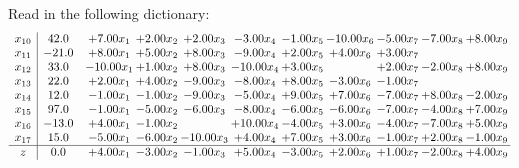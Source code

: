 \documentclass[9pt]{article}
\begin{document}
Read in the following dictionary:
\[\begin{array}{c| c c@{\hskip 2pt} c@{\hskip 2pt} c@{\hskip 2pt} c@{\hskip 2pt} c@{\hskip 2pt} c@{\hskip 2pt} c@{\hskip 2pt} c@{\hskip 2pt} c@{\hskip 2pt} }
 x_{10}   &  42.0 & +  7.00 x_{1} & +  2.00 x_{2} & +  2.00 x_{3} & -3.00 x_{4} & -1.00 x_{5} & -10.00 x_{6} & -5.00 x_{7} & -7.00 x_{8} & +  8.00 x_{9}\\
 x_{11}   &  -21.0 & +  8.00 x_{1} & +  5.00 x_{2} & +  8.00 x_{3} & -9.00 x_{4} & +  2.00 x_{5} & +  4.00 x_{6} & +  3.00 x_{7} &    &   \\
 x_{12}   &  33.0 & -10.00 x_{1} & +  1.00 x_{2} & +  8.00 x_{3} & -10.00 x_{4} & +  3.00 x_{5} &   & +  2.00 x_{7} & -2.00 x_{8} & +  8.00 x_{9}\\
 x_{13}   &  22.0 & +  2.00 x_{1} & +  4.00 x_{2} & -9.00 x_{3} & -8.00 x_{4} & +  8.00 x_{5} & -3.00 x_{6} & -1.00 x_{7} &    &   \\
 x_{14}   &  12.0 & -1.00 x_{1} & -1.00 x_{2} & -9.00 x_{3} & -5.00 x_{4} & +  9.00 x_{5} & +  7.00 x_{6} & -7.00 x_{7} & +  8.00 x_{8} & -2.00 x_{9}\\
 x_{15}   &  97.0 & -1.00 x_{1} & -5.00 x_{2} & -6.00 x_{3} & -8.00 x_{4} & -6.00 x_{5} & -6.00 x_{6} & -7.00 x_{7} & -4.00 x_{8} & +  7.00 x_{9}\\
 x_{16}   &  -13.0 & +  4.00 x_{1} & -1.00 x_{2} &   & + 10.00 x_{4} & -4.00 x_{5} & +  3.00 x_{6} & -4.00 x_{7} & -7.00 x_{8} & +  5.00 x_{9}\\
 x_{17}   &  15.0 & -5.00 x_{1} & -6.00 x_{2} & -10.00 x_{3} & +  4.00 x_{4} & +  7.00 x_{5} & +  3.00 x_{6} & -1.00 x_{7} & +  2.00 x_{8} & -1.00 x_{9}\\
\hline
z    &  0.0 & +  4.00 x_{1} & -3.00 x_{2} & -1.00 x_{3} & +  5.00 x_{4} & -3.00 x_{5} & +  2.00 x_{6} & +  1.00 x_{7} & -2.00 x_{8} & +  4.00 x_{9}\\
\end{array}\]
\end{document}
